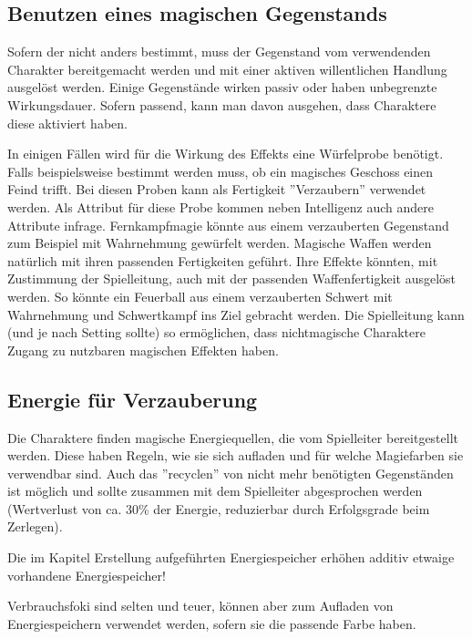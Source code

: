\documentclass{article}
\begin{document}
\begin{center}
\subsection{Benutzen eines magischen Gegenstands}
\end{center}

Sofern der nicht anders bestimmt, muss der Gegenstand vom verwendenden Charakter bereitgemacht werden und mit einer
aktiven willentlichen Handlung ausgelöst werden. Einige Gegenstände wirken passiv oder haben unbegrenzte Wirkungsdauer.
Sofern passend, kann man davon ausgehen, dass Charaktere diese aktiviert haben.

In einigen Fällen wird für die Wirkung des Effekts eine Würfelprobe benötigt. Falls beispielsweise bestimmt werden muss,
ob ein magisches Geschoss einen Feind trifft. Bei diesen Proben kann als Fertigkeit ''Verzaubern'' verwendet werden. Als
Attribut für diese Probe kommen neben Intelligenz auch andere Attribute infrage. Fernkampfmagie könnte aus einem
verzauberten Gegenstand zum Beispiel mit Wahrnehmung gewürfelt werden.
Magische Waffen werden natürlich mit ihren passenden Fertigkeiten geführt. Ihre Effekte könnten, mit Zustimmung der
Spielleitung, auch mit der passenden Waffenfertigkeit ausgelöst werden. So könnte ein Feuerball aus einem verzauberten
Schwert mit Wahrnehmung und Schwertkampf ins Ziel gebracht werden. Die Spielleitung kann (und je nach Setting sollte) so
ermöglichen, dass nichtmagische Charaktere Zugang zu nutzbaren magischen Effekten haben.

\begin{center}
\subsection{Energie für Verzauberung}
\end{center}

Die Charaktere finden magische Energiequellen, die vom Spielleiter bereitgestellt werden. Diese haben Regeln, wie sie
sich aufladen und für welche Magiefarben sie verwendbar sind. Auch das ''recyclen'' von nicht mehr benötigten
Gegenständen ist möglich und sollte zusammen mit dem Spielleiter abgesprochen werden (Wertverlust von ca. 30\% der
Energie, reduzierbar durch Erfolgsgrade beim Zerlegen).

Die im Kapitel Erstellung aufgeführten Energiespeicher erhöhen additiv etwaige vorhandene Energiespeicher!

Verbrauchsfoki sind selten und teuer, können aber zum Aufladen von Energiespeichern verwendet werden, sofern sie die
passende Farbe haben.
\end{document}
